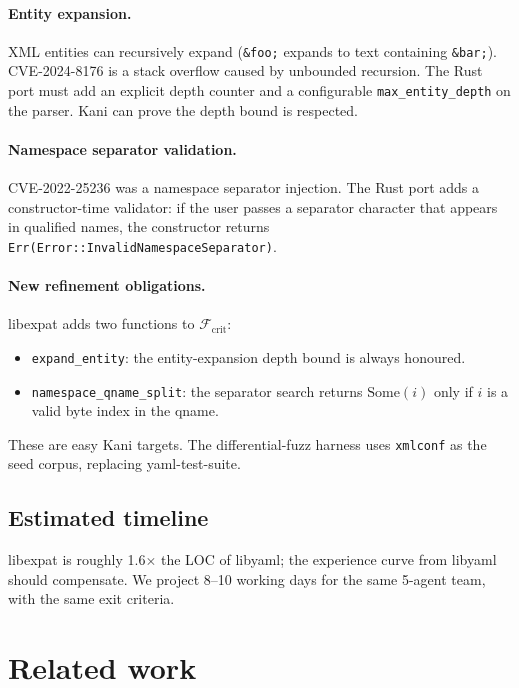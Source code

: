 \documentclass[12pt]{article}
\theoremstyle{definition}
\theoremstyle{remark}
\begin{document}
\paragraph{Entity expansion.} XML entities can recursively expand
(\texttt{\&foo;} expands to text containing \texttt{\&bar;}). CVE-2024-8176
is a stack overflow caused by unbounded recursion. The Rust port must
add an explicit depth counter and a configurable
\texttt{max\_entity\_depth} on the parser. Kani can prove the depth
bound is respected.

\paragraph{Namespace separator validation.} CVE-2022-25236 was a
namespace separator injection. The Rust port adds a constructor-time
validator: if the user passes a separator character that appears in
qualified names, the constructor returns
\texttt{Err(Error::InvalidNamespaceSeparator)}.

\paragraph{New refinement obligations.} libexpat adds two functions to
$\mathcal{F}_{\mathrm{crit}}$:
\begin{itemize}
\item \texttt{expand\_entity}: the entity-expansion depth bound is
  always honoured.
\item \texttt{namespace\_qname\_split}: the separator search returns
  $\mathrm{Some}(i)$ only if $i$ is a valid byte index in the qname.
\end{itemize}

These are easy Kani targets. The differential-fuzz harness uses
\texttt{xmlconf} \cite{w3c2014xmlconf} as the seed corpus, replacing
yaml-test-suite.

\subsection{Estimated timeline}

libexpat is roughly 1.6$\times$ the LOC of libyaml; the experience
curve from libyaml should compensate. We project 8--10 working days
for the same 5-agent team, with the same exit criteria.

\section{Related work}
\label{sec:related}
\end{document}
